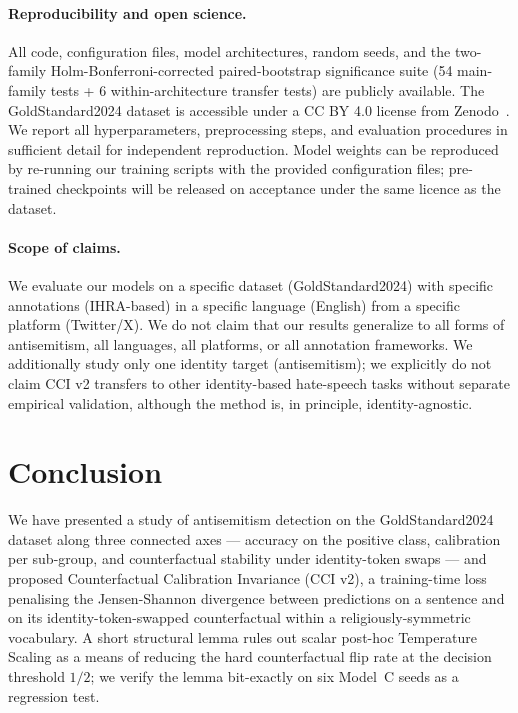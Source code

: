 \documentclass[10pt,a4paper]{article}
\begin{document}
\paragraph{Reproducibility and open science.}
All code, configuration files, model architectures, random seeds, and the two-family Holm-Bonferroni-corrected paired-bootstrap significance suite (54 main-family tests + 6 within-architecture transfer tests) are publicly available. The GoldStandard2024 dataset is accessible under a CC BY 4.0 license from Zenodo~\citep{jikeli2024goldstandard}. We report all hyperparameters, preprocessing steps, and evaluation procedures in sufficient detail for independent reproduction. Model weights can be reproduced by re-running our training scripts with the provided configuration files; pre-trained checkpoints will be released on acceptance under the same licence as the dataset.

\paragraph{Scope of claims.}
We evaluate our models on a specific dataset (GoldStandard2024) with specific annotations (IHRA-based) in a specific language (English) from a specific platform (Twitter/X). We do not claim that our results generalize to all forms of antisemitism, all languages, all platforms, or all annotation frameworks. We additionally study only one identity target (antisemitism); we explicitly do not claim CCI v2 transfers to other identity-based hate-speech tasks without separate empirical validation, although the method is, in principle, identity-agnostic.


\section{Conclusion}
\label{sec:conclusion}

We have presented a study of antisemitism detection on the GoldStandard2024 dataset along three connected axes --- accuracy on the positive class, calibration per sub-group, and counterfactual stability under identity-token swaps --- and proposed Counterfactual Calibration Invariance (CCI v2), a training-time loss penalising the Jensen-Shannon divergence between predictions on a sentence and on its identity-token-swapped counterfactual within a religiously-symmetric vocabulary. A short structural lemma rules out scalar post-hoc Temperature Scaling as a means of reducing the hard counterfactual flip rate at the decision threshold $1/2$; we verify the lemma bit-exactly on six Model~C seeds as a regression test.
\end{document}
